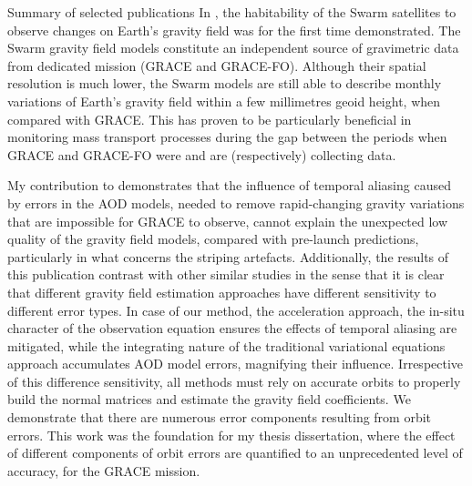 \begin{cvtext}{Summary of selected publications}
In \cite{TeixeiraEncarnacao2016}, the habitability of the Swarm satellites to observe changes on Earth's gravity field was for the first time demonstrated.
The Swarm gravity field models constitute an independent source of gravimetric data from dedicated mission (\ac{GRACE} and \ac{GRACE-FO}).
Although their spatial resolution is much lower, the Swarm models are still able to describe monthly variations of Earth's gravity field within a few millimetres geoid height, when compared with \ac{GRACE}.
This has proven to be particularly beneficial in monitoring mass transport processes during the gap between the periods when \ac{GRACE} and \ac{GRACE-FO} were and are (respectively) collecting data.

My contribution to \cite{Ditmar2012} demonstrates that the influence of temporal aliasing caused by errors in the \ac{AOD} models, needed to remove rapid-changing gravity variations that are impossible for \ac{GRACE} to observe, cannot explain the unexpected low quality of the gravity field models, compared with pre-launch predictions, particularly in what concerns the striping artefacts.
Additionally, the results of this publication contrast with other similar studies in the sense that it is clear that different gravity field estimation approaches have different sensitivity to different error types.
In case of our method, the acceleration approach, the in-situ character of the observation equation ensures the effects of temporal aliasing are mitigated, while the integrating nature of the traditional variational equations approach accumulates \ac{AOD} model errors, magnifying their influence.
Irrespective of this difference sensitivity, all methods must rely on accurate orbits to properly build the normal matrices and estimate the gravity field coefficients.
We demonstrate that there are numerous error components resulting from orbit errors.
This work was the foundation for my thesis dissertation, where the effect of different components of orbit errors are quantified to an unprecedented level of accuracy, for the \ac{GRACE} mission.


\end{cvtext}
